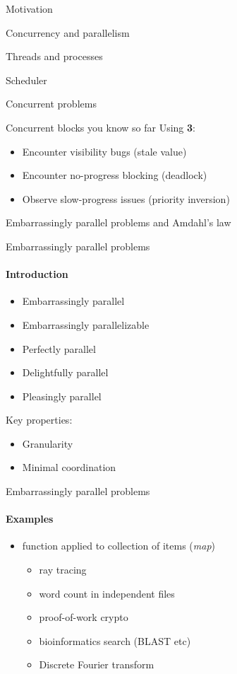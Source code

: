\begin{section}{Motivation}
\begin{section}{Concurrency and parallelism}
\begin{section}{Threads and processes}
\begin{section}{Scheduler}
\begin{section}{Concurrent problems}
\begin{frame}{Concurrent blocks you know so far}
\pause 
Using \textbf{3}:
\begin{itemize}
    \item Encounter visibility bugs (stale value)
    \item Encounter no-progress blocking (deadlock)
    \item Observe slow-progress issues (priority inversion) 
\end{itemize}

\end{frame}


\begin{subsection}{Embarrassingly parallel problems and Amdahl's law}
\showTOCSub

\begin{frame}{Embarrassingly parallel problems}
\framesubtitle{Introduction}

\begin{itemize}
        \item Embarrassingly parallel
        \item Embarrassingly parallelizable
        \item Perfectly parallel
        \item Delightfully parallel
        \item Pleasingly parallel
\end{itemize}

Key properties:
\begin{itemize}
        \item Granularity
        \item Minimal coordination
\end{itemize}
\end{frame}


\begin{frame}{Embarrassingly parallel problems}
\framesubtitle{Examples}

\begin{itemize}
    \item function applied to collection of items (\textit{map})
    \begin{itemize}
        \item ray tracing
        \item word count in independent files
        \item proof-of-work crypto
        \item bioinformatics search (BLAST etc)
        \item Discrete Fourier transform
    \end{itemize}


\end{itemize}
\end{frame}
\end{subsection}
\end{section}
\end{section}
\end{section}
\end{section}
\end{section}
